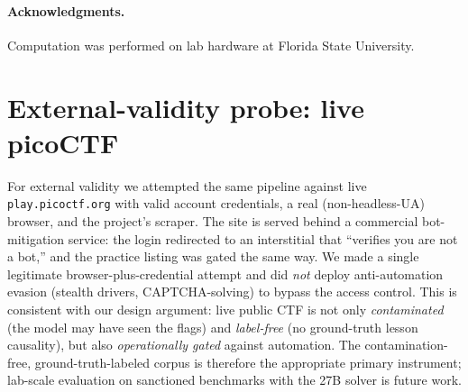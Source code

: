 \documentclass[10pt,twocolumn]{article}
\begin{document}
\paragraph{Acknowledgments.} Computation was performed on lab hardware at Florida State
University.

{\small

}

\appendix
\section{External-validity probe: live picoCTF}\label{app:pico}
For external validity we attempted the same pipeline against live
\texttt{play.picoctf.org} with valid account credentials, a real (non-headless-UA)
browser, and the project's scraper. The site is served behind a commercial
bot-mitigation service: the login redirected to an interstitial that
``verifies you are not a bot,'' and the practice listing was gated the same way.
We made a single legitimate browser-plus-credential attempt and did \emph{not}
deploy anti-automation evasion (stealth drivers, CAPTCHA-solving) to bypass the
access control. This is consistent with our design argument: live public CTF is
not only \emph{contaminated} (the model may have seen the flags) and
\emph{label-free} (no ground-truth lesson causality), but also \emph{operationally
gated} against automation. The contamination-free, ground-truth-labeled corpus is
therefore the appropriate primary instrument; lab-scale evaluation on sanctioned
benchmarks \citep{Cybench,NYUCTFBench,CyberGym} with the 27B solver is future work.
\end{document}
